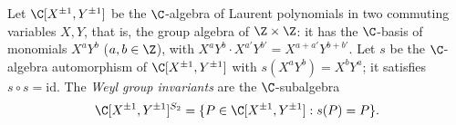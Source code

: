 Let $\C[X^{\pm1},Y^{\pm1}]$ be the $\C$-algebra of Laurent polynomials in two commuting variables $X,Y$, that is, the
group algebra of $\Z\times\Z$: it has the $\C$-basis of monomials $X^aY^b$ ($a,b\in\Z$), with
$X^aY^b\cdot X^{a'}Y^{b'}=X^{a+a'}Y^{b+b'}$. Let $s$ be the $\C$-algebra automorphism of $\C[X^{\pm1},Y^{\pm1}]$ with
$s(X^aY^b)=X^bY^a$; it satisfies $s\circ s=\mathrm{id}$. The \emph{Weyl group invariants} are the $\C$-subalgebra
\[
  \C[X^{\pm1},Y^{\pm1}]^{S_2}=\{P\in\C[X^{\pm1},Y^{\pm1}]:s(P)=P\}.
\]
